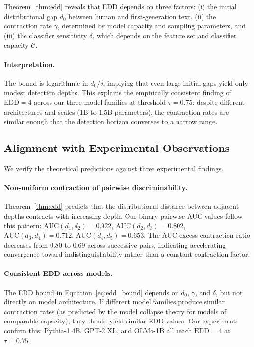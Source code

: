 Theorem~\ref{thm:edd} reveals that EDD depends on three factors: (i) the initial distributional gap $d_0$ between human and first-generation text, (ii) the contraction rate $\gamma$, determined by model capacity and sampling parameters, and (iii) the classifier sensitivity $\delta$, which depends on the feature set and classifier capacity $\mathcal{C}$.

\paragraph{Interpretation.} The bound is logarithmic in $d_0/\delta$, implying that even large initial gaps yield only modest detection depths. This explains the empirically consistent finding of $\text{EDD} = 4$ across our three model families at threshold $\tau = 0.75$: despite different architectures and scales (1B to 1.5B parameters), the contraction rates are similar enough that the detection horizon converges to a narrow range.

\subsection{Alignment with Experimental Observations}
\label{sec:theory:validation}

We verify the theoretical predictions against three experimental findings.

\paragraph{Non-uniform contraction of pairwise discriminability.}
Theorem~\ref{thm:edd} predicts that the distributional distance between adjacent depths contracts with increasing depth. Our binary pairwise AUC values follow this pattern: $\text{AUC}(d_1, d_2) = 0.922$, $\text{AUC}(d_2, d_3) = 0.802$, $\text{AUC}(d_3, d_4) = 0.712$, $\text{AUC}(d_4, d_5) = 0.653$. The AUC-excess contraction ratio decreases from 0.80 to 0.69 across successive pairs, indicating accelerating convergence toward indistinguishability rather than a constant contraction factor.

\paragraph{Consistent EDD across models.}
The EDD bound in Equation~\eqref{eq:edd_bound} depends on $d_0$, $\gamma$, and $\delta$, but not directly on model architecture. If different model families produce similar contraction rates (as predicted by the model collapse theory for models of comparable capacity), they should yield similar EDD values. Our experiments confirm this: Pythia-1.4B, GPT-2 XL, and OLMo-1B all reach $\text{EDD} = 4$ at $\tau = 0.75$.

